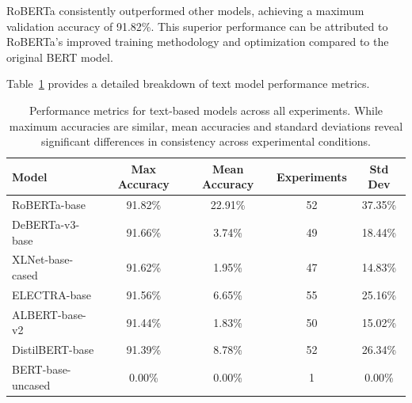 \documentclass[12pt]{article}
\begin{document}
RoBERTa consistently outperformed other models, achieving a maximum validation accuracy of 91.82\%. This superior performance can be attributed to RoBERTa's improved training methodology and optimization compared to the original BERT model.

Table~\ref{tab:text_model_performance} provides a detailed breakdown of text model performance metrics.

\begin{table}[h]
\centering
\begin{tabular}{|l|c|c|c|c|}
\hline
\textbf{Model} & \textbf{Max Accuracy} & \textbf{Mean Accuracy} & \textbf{Experiments} & \textbf{Std Dev} \\
\hline
RoBERTa-base & 91.82\% & 22.91\% & 52 & 37.35\% \\
\hline
DeBERTa-v3-base & 91.66\% & 3.74\% & 49 & 18.44\% \\
\hline
XLNet-base-cased & 91.62\% & 1.95\% & 47 & 14.83\% \\
\hline
ELECTRA-base & 91.56\% & 6.65\% & 55 & 25.16\% \\
\hline
ALBERT-base-v2 & 91.44\% & 1.83\% & 50 & 15.02\% \\
\hline
DistilBERT-base & 91.39\% & 8.78\% & 52 & 26.34\% \\
\hline
BERT-base-uncased & 0.00\% & 0.00\% & 1 & 0.00\% \\
\hline
\end{tabular}
\caption{Performance metrics for text-based models across all experiments. While maximum accuracies are similar, mean accuracies and standard deviations reveal significant differences in consistency across experimental conditions.}
\label{tab:text_model_performance}
\end{table}
\end{document}
